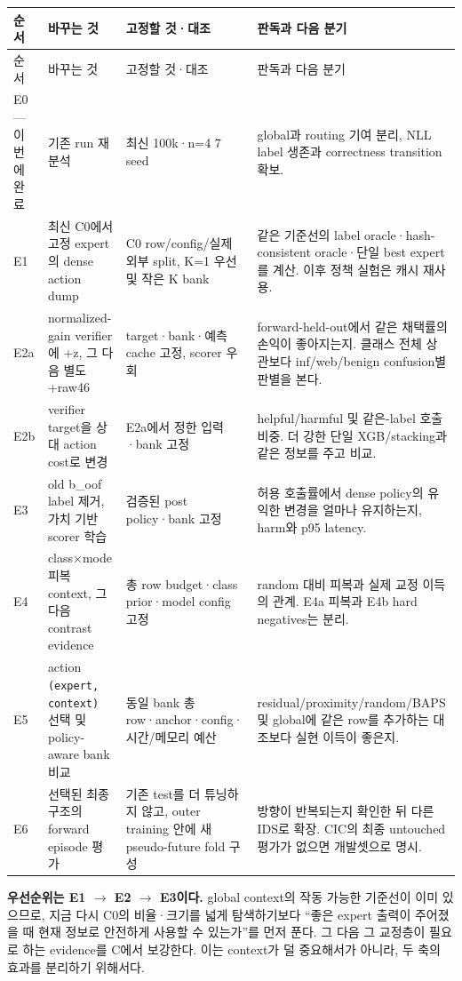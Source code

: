 \begingroup
\footnotesize
\begin{longtable}{>{\raggedright\arraybackslash}p{}>{\raggedright\arraybackslash}p{}>{\raggedright\arraybackslash}p{}>{\raggedright\arraybackslash}p{}}
\toprule
순서 & 바꾸는 것 & 고정할 것·대조 & 판독과 다음 분기 \\ \midrule
\endfirsthead
순서 & 바꾸는 것 & 고정할 것·대조 & 판독과 다음 분기 \\ \midrule
\endhead
{}E0 — 이번에 완료 & 기존 run 재분석 & 최신 100k·n=\allowbreak{}4 7 seed & global과 routing 기여 분리, NLL label 생존과 correctness transition 확보. \\
{}E1 & 최신 C0에서 고정 expert의 dense action dump & C0 row/\allowbreak{}config/\allowbreak{}실제 외부 split, K=\allowbreak{}1 우선 및 작은 K bank & 같은 기준선의 label oracle·hash-consistent oracle·단일 best expert를 계산. 이후 정책 실험은 캐시 재사용. \\
{}E2a & normalized-gain verifier에 +\allowbreak{}z, 그 다음 별도 +\allowbreak{}raw46 & target·bank·예측 cache 고정, scorer 우회 & forward-held-out에서 같은 채택률의 손익이 좋아지는지. 클래스 전체 상관보다 inf/\allowbreak{}web/\allowbreak{}benign confusion별 판별을 본다. \\
{}E2b & verifier target을 상대 action cost로 변경 & E2a에서 정한 입력·bank 고정 & helpful/\allowbreak{}harmful 및 같은-label 호출 비중. 더 강한 단일 XGB/\allowbreak{}stacking과 같은 정보를 주고 비교. \\
{}E3 & old b\_\allowbreak{}oof label 제거, 가치 기반 scorer 학습 & 검증된 post policy·bank 고정 & 허용 호출률에서 dense policy의 유익한 변경을 얼마나 유지하는지, harm와 p95 latency. \\
{}E4 & class×mode 피복 context, 그 다음 contrast evidence & 총 row budget·class prior·model config 고정 & random 대비 피복과 실제 교정 이득의 관계. E4a 피복과 E4b hard negatives는 분리. \\
{}E5 & action \texttt{(expert,\allowbreak{} context\allowbreak{})} 선택 및 policy-aware bank 비교 & 동일 bank 총 row·anchor·config·시간/\allowbreak{}메모리 예산 & residual/\allowbreak{}proximity/\allowbreak{}random/\allowbreak{}BAPS 및 global에 같은 row를 추가하는 대조보다 실현 이득이 좋은지. \\
{}E6 & 선택된 최종 구조의 forward episode 평가 & 기존 test를 더 튜닝하지 않고, outer training 안에 새 pseudo-future fold 구성 & 방향이 반복되는지 확인한 뒤 다른 IDS로 확장. CIC의 최종 untouched 평가가 없으면 개발셋으로 명시. \\
\bottomrule
\end{longtable}
\endgroup
\textbf{우선순위는 E1 \ensuremath{\rightarrow} E2 \ensuremath{\rightarrow} E3이다.} global context의 작동 가능한 기준선이 이미 있으므로, 지금 다시 C0의 비율·크기를 넓게 탐색하기보다 “좋은 expert 출력이 주어졌을 때 현재 정보로 안전하게 사용할 수 있는가”를 먼저 푼다. 그 다음 그 교정층이 필요로 하는 evidence를 C에서 보강한다. 이는 context가 덜 중요해서가 아니라, 두 축의 효과를 분리하기 위해서다.

